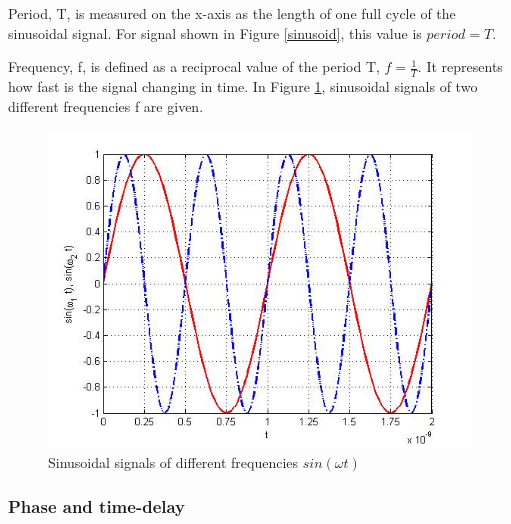 \documentclass{ximera}
\begin{document}
\begin{definition}
Period, T, is measured on the x-axis as the length of one full cycle of the sinusoidal signal. For signal shown in Figure \ref{sinusoid}, this value is $period=T$. 
\end{definition}

\begin{definition}
Frequency, f,  is defined as a reciprocal value of the period T, $f=\frac{1}{T}$. It represents how fast is the signal changing in time.  In Figure \ref{sinF1F2}, sinusoidal signals of two different frequencies f are given. 

\begin{figure}[htbp]
\includegraphics[scale=0.4]{jpg/cpef6.jpg}
\caption{Sinusoidal signals of different frequencies $sin ( \omega t)$}
\label{sinF1F2}
\end{figure}

\end{definition}

\subsubsection{Phase and time-delay}
\end{document}
